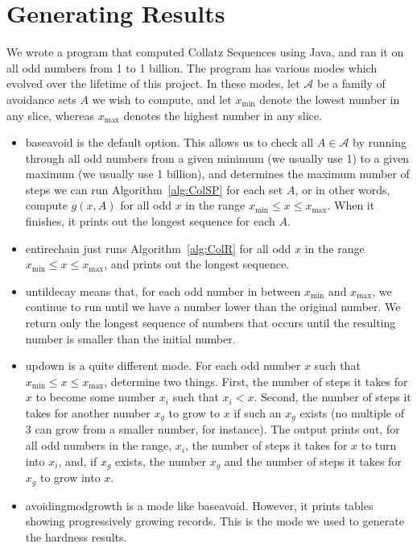\section{Generating Results} \label{subsec:algcomp}
We wrote a program that computed Collatz Sequences using Java, and ran it on all odd numbers from 1 to 1 billion. The program has various modes which evolved over the lifetime of this project. In these modes, let $\mathcal{A}$ be a family of avoidance sets $A$ we wish to compute, and let $x_{\min}$ denote the lowest number in any slice, whereas $x_{\max}$ denotes the highest number in any slice.
\begin{itemize}
    \item baseavoid is the default option. This allows us to check all $A \in \mathcal{A}$ by running through all odd numbers from a given minimum (we usually use 1) to a given maximum (we usually use 1 billion), and determines the maximum number of steps we can run Algorithm~\ref{alg:ColSP} for each set $A$, or in other words, compute $g(x,A)$ for all odd $x$ in the range $x_{\min} \leq x \leq x_{\max}$. When it finishes, it prints out the longest sequence for each $A$.
    \item entirechain just runs Algorithm~\ref{alg:ColR} for all odd $x$ in the range $x_{\min} \leq x \leq x_{\max}$, and prints out the longest sequence.
    \item untildecay means that, for each odd number in between $x_{\min}$ and $x_{\max}$, we continue to run until we have a number lower than the original number. We return only the longest sequence of numbers that occurs until the resulting number is smaller than the initial number.
    \item updown is a quite different mode. For each odd number $x$ such that $x_{\min}\leq x \leq x_{\max}$, determine two things. First, the number of steps it takes for $x$ to become some number $x_i$ such that $x_i < x$. Second, the number of steps it takes for another number $x_g$ to grow to $x$ if such an $x_g$ exists (no multiple of 3 can grow from a smaller number, for instance). The output prints out, for all odd numbers in the range, $x_i$, the number of steps it takes for $x$ to turn into $x_i$, and, if $x_g$ exists, the number $x_g$ and the number of steps it takes for $x_g$ to grow into $x$.
    \item avoidingmodgrowth is a mode like baseavoid. However, it prints tables showing progressively growing records. This is the mode we used to generate the hardness results.
\end{itemize}
